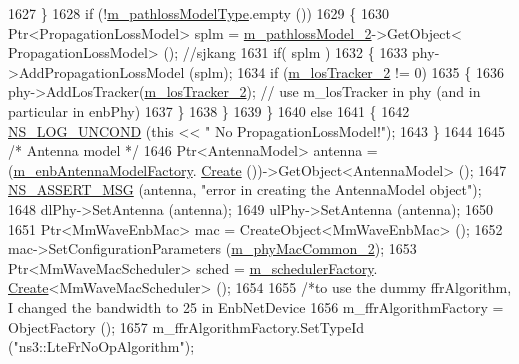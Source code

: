 \begin{DoxyCode}
1627         \}
1628         \textcolor{keywordflow}{if} (!\hyperlink{classns3_1_1MmWaveHelper_a7f17e9bc4797b51d9a31d16c7e667960}{m\_pathlossModelType}.empty ())
1629         \{
1630                 Ptr<PropagationLossModel> splm = \hyperlink{classns3_1_1MmWaveHelper_a463070ab19ee9776262439eda4edf3e2}{m\_pathlossModel\_2}->GetObject<
      PropagationLossModel> (); \textcolor{comment}{//sjkang}
1631                 \textcolor{keywordflow}{if}( splm )
1632                 \{
1633                         phy->AddPropagationLossModel (splm);
1634                         \textcolor{keywordflow}{if} (\hyperlink{classns3_1_1MmWaveHelper_a69ccf3ffeee48b44244b478aba4eba18}{m\_losTracker\_2} != 0)
1635                         \{
1636                                 phy->AddLosTracker(\hyperlink{classns3_1_1MmWaveHelper_a69ccf3ffeee48b44244b478aba4eba18}{m\_losTracker\_2}); \textcolor{comment}{// use m\_losTracker in
       phy (and in particular in enbPhy)}
1637                         \}
1638                 \}
1639         \}
1640         \textcolor{keywordflow}{else}
1641         \{
1642                 \hyperlink{log-macros-disabled_8h_a0b36e5e182b37194f85ef1c5e979fb2e}{NS\_LOG\_UNCOND} (\textcolor{keyword}{this} << \textcolor{stringliteral}{" No PropagationLossModel!"});
1643         \}
1644 
1645         \textcolor{comment}{/* Antenna model */}
1646         Ptr<AntennaModel> antenna = (\hyperlink{classns3_1_1MmWaveHelper_a840991b3233061820c1a85a403510388}{m\_enbAntennaModelFactory}.
      \hyperlink{classns3_1_1ObjectFactory_a18152e93f0a6fe184ed7300cb31e9896}{Create} ())->GetObject<AntennaModel> ();
1647         \hyperlink{assert_8h_aff5ece9066c74e681e74999856f08539}{NS\_ASSERT\_MSG} (antenna, \textcolor{stringliteral}{"error in creating the AntennaModel object"});
1648         dlPhy->SetAntenna (antenna);
1649         ulPhy->SetAntenna (antenna);
1650 
1651         Ptr<MmWaveEnbMac> mac = CreateObject<MmWaveEnbMac> ();
1652         mac->SetConfigurationParameters (\hyperlink{classns3_1_1MmWaveHelper_ab4e9d2f9a49a485dadb3404e8c196f4c}{m\_phyMacCommon\_2});
1653         Ptr<MmWaveMacScheduler> sched = \hyperlink{classns3_1_1MmWaveHelper_ab42906da163580835d24bfd206242167}{m\_schedulerFactory}.
      \hyperlink{classns3_1_1ObjectFactory_a18152e93f0a6fe184ed7300cb31e9896}{Create}<MmWaveMacScheduler> ();
1654 
1655         \textcolor{comment}{/*to use the dummy ffrAlgorithm, I changed the bandwidth to 25 in EnbNetDevice}
1656 \textcolor{comment}{        m\_ffrAlgorithmFactory = ObjectFactory ();}
1657 \textcolor{comment}{        m\_ffrAlgorithmFactory.SetTypeId ("ns3::LteFrNoOpAlgorithm");}

\end{DoxyCode}
